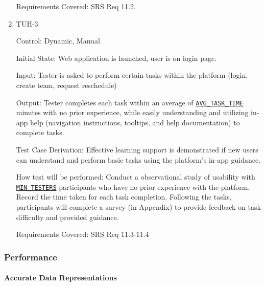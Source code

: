 \documentclass[12pt, titlepage]{article}
\begin{document}
\begin{enumerate}
          Requirements Covered: SRS Req 11.2.

    \item{TUH-3\\}

          Control: Dynamic, Manual

          Initial State:  Web application is launched, user is on login page.

          Input: Tester is asked to perform certain tasks within the platform (login, create team, request reschedule)

          Output: Tester completes each task within an average of \hyperref[AVG_TASK_TIME]{\texttt{AVG\_TASK\_TIME}} minutes with no prior experience, while easily understanding and utilizing in-app help (navigation instructions, tooltips, and help documentation) to complete tasks.

          Test Case Derivation: Effective learning support is demonstrated if new users can understand and perform basic tasks using the platform's in-app guidance.

          How test will be performed: Conduct a observational study of usability with \hyperref[MIN_TESTERS]{\texttt{MIN\_TESTERS}} participants who have no prior experience with the platform. Record the time taken for each task completion. Following the tasks, participants will complete a survey (in Appendix) to provide feedback on task difficulty and provided guidance.

          Requirements Covered: SRS Req 11.3-11.4

\end{enumerate}

\subsubsection{Performance}

\paragraph{Accurate Data Representations}
\end{document}

